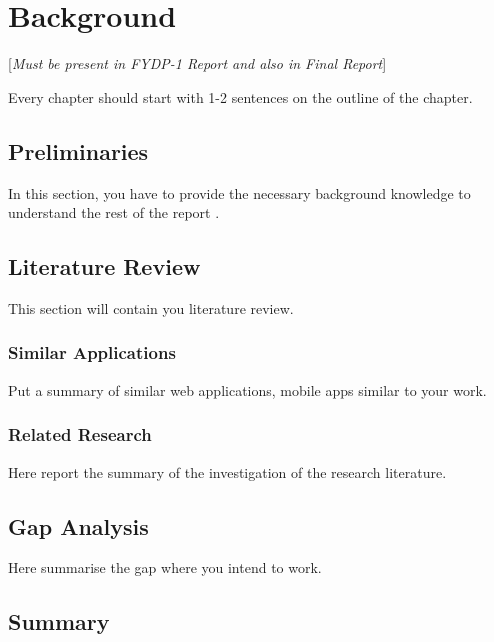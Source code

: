 \chapter{Background}

[\textit{Must be present in FYDP-1 Report and also in Final Report}]

Every chapter should start with 1-2 sentences on the outline of the chapter.

\section{Preliminaries}
In this section, you have to provide the necessary background knowledge to understand the rest of the report \cite{kleinberg2006algorithm}.
\section{Literature Review}
This section will contain you literature review.
\subsection{Similar Applications}
Put a summary of similar web applications, mobile apps similar to your work.
\subsection{Related Research}
Here report the summary of the investigation of the research literature.
\section{Gap Analysis}
Here summarise the gap where you intend to work.
\section{Summary}

